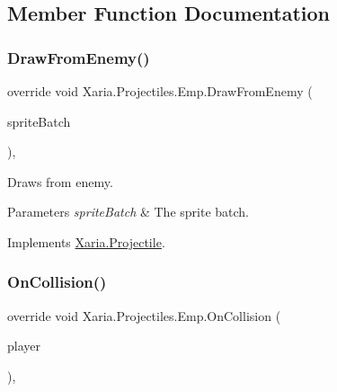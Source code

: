 \subsection{Member Function Documentation}
\mbox{\label{classXaria_1_1Projectiles_1_1Emp_a9eded776a417679715918b35bfcba6d7}} 
\subsubsection{\texorpdfstring{Draw\+From\+Enemy()}{DrawFromEnemy()}}
{\footnotesize\ttfamily override void Xaria.\+Projectiles.\+Emp.\+Draw\+From\+Enemy (\begin{DoxyParamCaption}\item[{ref Sprite\+Batch}]{sprite\+Batch }\end{DoxyParamCaption})\hspace{0.3cm}{\ttfamily [inline]}, {\ttfamily [virtual]}}



Draws from enemy. 


\begin{DoxyParams}{Parameters}
{\em sprite\+Batch} & The sprite batch.\\
\hline
\end{DoxyParams}


Implements \hyperlink{classXaria_1_1Projectile_a92b00c404863fc5ef875fb598345bcbc}{Xaria.\+Projectile}.

\mbox{\label{classXaria_1_1Projectiles_1_1Emp_a08ccc50483dd74dacf633f820592cd04}} 
\subsubsection{\texorpdfstring{On\+Collision()}{OnCollision()}\hspace{0.1cm}{\footnotesize\ttfamily [1/2]}}
{\footnotesize\ttfamily override void Xaria.\+Projectiles.\+Emp.\+On\+Collision (\begin{DoxyParamCaption}\item[{ref \hyperlink{classXaria_1_1Player}{Player}}]{player }\end{DoxyParamCaption})\hspace{0.3cm}{\ttfamily [inline]}, {\ttfamily [virtual]}}



